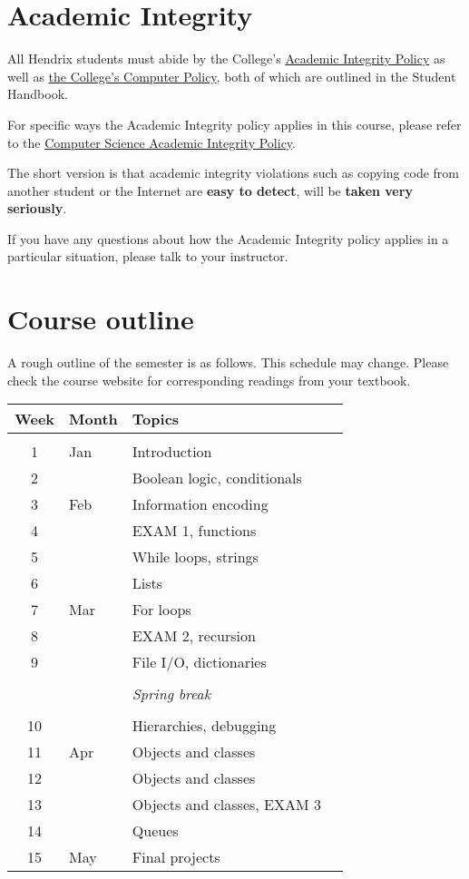 \documentclass{article}
\begin{document}
\section*{Academic Integrity}

All Hendrix students must abide by the College's
\href{https://www.hendrix.edu/studentlife/handbook.aspx?id=67121}{Academic
Integrity Policy} as well as
\href{https://www.hendrix.edu/studentlife/handbook.aspx?id=42308}{the
College's Computer Policy}, both of which are outlined in the Student
Handbook.

For specific ways the Academic Integrity policy applies in this
course, please refer to the
\href{http://ozark.hendrix.edu/~yorgey/ac-integrity-policy.html}{Computer
  Science Academic Integrity Policy}.

The short version is that academic integrity violations such as
copying code from another student or the Internet are \textbf{easy to
  detect}, will be \textbf{taken
very seriously}.

If you have any questions about how the Academic Integrity policy
applies in a particular situation, please talk to your instructor.

\section*{Course outline}

A rough outline of the semester is as follows.  This schedule may
change.  Please check the course website for corresponding readings
from your textbook.

\begin{tabular}{cllp{3in}}
  Week & Month & Topics \\
  \hline \\
  1 & Jan & Introduction \\
  2 &     & Boolean logic, conditionals \\
  3 & Feb & Information encoding \\
  4 &     & EXAM 1, functions \\
  5 &     & While loops, strings \\
  6 &     & Lists \\
  7 & Mar & For loops \\
  8 &     & EXAM 2, recursion \\
  9 &     & File I/O, dictionaries \\
  & & \\
  & & \emph{Spring break} \\
  & & \\
  10 &    & Hierarchies, debugging \\
  11 & Apr & Objects and classes \\
  12 &     & Objects and classes \\
  13 &     & Objects and classes, EXAM 3 \\
  14 &     & Queues \\
  15 & May & Final projects
\end{tabular}
\end{document}
